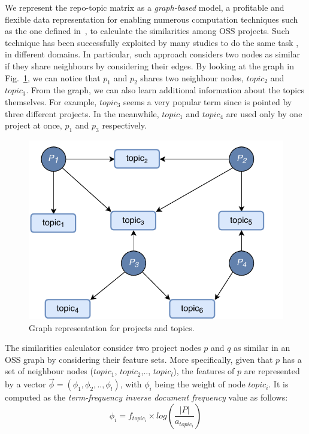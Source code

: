 We represent the repo-topic matrix as a \textit{graph-based} model, a profitable and flexible data representation for enabling numerous computation techniques such as the one defined in~\cite{Nguyen:2019:FRS:3339505.3339636},\cite{8498236} to calculate the similarities among OSS projects. Such technique has been successfully exploited by many studies to do the same task \cite{DiNoia:2012:LOD:2362499.2362501},\cite{BRIGUEZ20146467} in different domains. 
In particular, such approach considers two nodes as similar if they share neighbours by considering their edges. By looking at the graph in Fig.~\ref{fig:Graph}, we can notice that $p_1$ and $p_2$ shares two neighbour nodes, \ie  $topic_{2}$ and $topic_{3}$. From the graph, we can also learn additional information about the topics themselves. For example, $topic_{3}$ seems a very popular term since is pointed by three
different projects. In the meanwhile, $topic_1$ and $topic_4$ are used only by one project at once, $p_1$ and $p_3$ respectively. 

%

\begin{figure}[t!]
\centering
\includegraphics[width=0.8\columnwidth]{figs/graphCFtop.pdf}
\caption{Graph representation for projects and topics.}
\label{fig:Graph}
\end{figure}


The similarities calculator consider two project nodes $p$ and $q$ as similar in an OSS graph  
by considering their feature sets. More specifically, given that $p$ has a 
set of neighbour nodes 
($topic_{1}$, $topic_{2}$,.., $topic_{l}$), the features of $p$ are represented by a vector 
$\overrightarrow{\phi}=(\phi_{1},\phi_{2},..,\phi_{l})$, with $\phi_{i}$ being the weight of node 
$topic_{i}$. It is computed as the \emph{term-frequency inverse document frequency} value as follows: 
\begin{equation}\label{eqn:TFIDF}
\phi_{i} = f_{topic_{i}} \times log(\frac{ \left | P \right |}{a_{topic_{i}}})
\end{equation}

